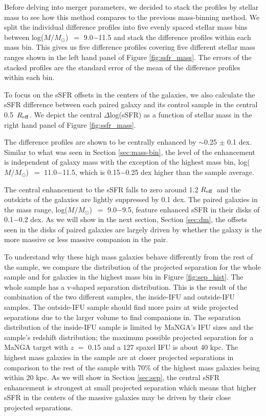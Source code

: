 \documentclass[iop,revtex4,twocolumn,apj,numberedappendix,appendixfloats]{emulateapj}
\newcommand{\reff}{$R_{\rm eff}$}
\newcommand{\logm}{log($M/M_{\odot}$)}
\begin{document}
Before delving into merger parameters, we decided to stack the profiles by stellar mass to see how this method compares to the previous mass-binning method. We split the individual difference profiles into five evenly spaced stellar mass bins between \logm\ $=$ 9.0$-$11.5 and stack the difference profiles within each mass bin. This gives us five difference profiles covering five different stellar mass ranges shown in the left hand panel of Figure \ref{fig:ssfr_mass}. The errors of the stacked profiles are the standard error of the mean of the difference profiles within each bin.

To focus on the sSFR offsets in the centers of the galaxies, we also calculate the sSFR difference between each paired galaxy and its control sample in the central 0.5~\reff. We depict the central $\Delta$log(sSFR) as a function of stellar mass in the right hand panel of Figure \ref{fig:ssfr_mass}.

The difference profiles are shown to be centrally enhanced by $\sim$0.25 $\pm$ 0.1 dex. Similar to what was seen in Section \ref{sec:mass-bin}, the level of the enhancement is independent of galaxy mass with the exception of the highest mass bin, \logm\ $=$ 11.0$-$11.5, which is 0.15$-$0.25 dex higher than the sample average. 

The central enhancement to the sSFR falls to zero around 1.2 \reff\ and the outskirts of the galaxies are lightly suppressed by 0.1 dex. The paired galaxies in the mass range, \logm\ $=$ 9.0$-$9.5, feature enhanced sSFR in their disks of 0.1$-$0.2 dex. As we will show in the next section, Section \ref{sec:dm}, the offsets seen in the disks of paired galaxies are largely driven by whether the galaxy is the more massive or less massive companion in the pair.

To understand why these high mass galaxies behave differently from the rest of the sample, we compare the distribution of the projected separation for the whole sample and for galaxies in the highest mass bin in Figure \ref{fig:sep_hist}. The whole sample has a v-shaped separation distribution. This is the result of the combination of the two different samples, the inside-IFU and outside-IFU samples. The outside-IFU sample should find more pairs at wide projected separations due to the larger volume to find companions in. The separation distribution of the inside-IFU sample is limited by MaNGA's IFU sizes and the sample's redshift distribution; the maximum possible projected separation for a MaNGA target with $z$ $=$ 0.15 and a 127 spaxel IFU is about 40 kpc. The highest mass galaxies in the sample are at closer projected separations in comparison to the rest of the sample with 70\% of the highest mass galaxies being within 20 kpc. As we will show in Section \ref{sec:sep}, the central sSFR enhancement is strongest at small projected separation which means that higher sSFR in the centers of the massive galaxies may be driven by their close projected separations. 
\end{document}
